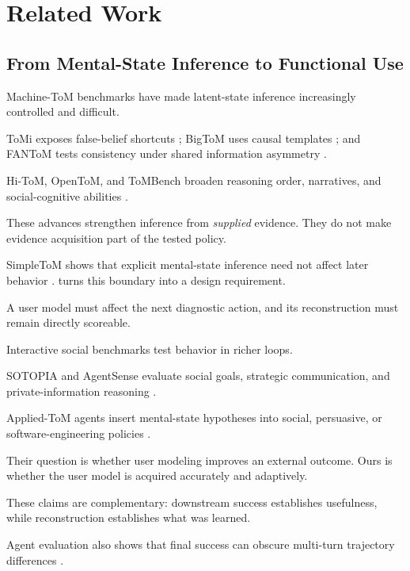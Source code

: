 \section{Related Work}
\label{sec:related}

\subsection{From Mental-State Inference to Functional Use}

Machine-ToM benchmarks have made latent-state inference increasingly controlled and difficult.

ToMi exposes false-belief shortcuts \citep{le2019revisiting}; BigToM uses causal templates
\citep{gandhi2023bigtom}; and FANToM tests consistency under shared information asymmetry
\citep{kim2023fantom}.

Hi-ToM, OpenToM, and ToMBench broaden reasoning order, narratives, and social-cognitive abilities
\citep{wu2023hitom,xu2024opentom,chen2024tombench}.

These advances strengthen inference from \emph{supplied} evidence. They do not make evidence acquisition
part of the tested policy.

SimpleToM shows that explicit mental-state inference need not affect later behavior
\citep{gu2024simpletom}. \knowact turns this boundary into a design requirement.

A user model must affect the next diagnostic action, and its reconstruction must remain directly
scoreable.

Interactive social benchmarks test behavior in richer loops.

SOTOPIA and AgentSense evaluate social goals, strategic communication, and private-information reasoning
\citep{zhou2024sotopia,mou2025agentsense}.

Applied-ToM agents insert mental-state hypotheses into social, persuasive, or software-engineering
policies \citep{hwang2026infusing,wang2026tomelp,zhou2026tomswe}.

Their question is whether user modeling improves an external outcome. Ours is whether the user model is
acquired accurately and adaptively.

These claims are complementary: downstream success establishes usefulness, while reconstruction
establishes what was learned.

Agent evaluation also shows that final success can obscure multi-turn trajectory differences
\citep{wang2024mint,ma2024agentboard}.

